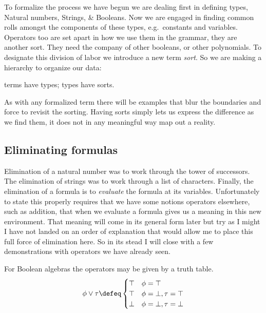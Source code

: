 To formalize the process we have begun we are dealing first in defining types, 
Natural numbers, Strings, \& Booleans.  Now we are engaged in finding common rolls 
amongst the components of these types, e.g.\ constants and variables.
Operators too are set apart in how we use them in the grammar, they are another sort.  They 
need the company of other booleans, or other polynomials.
To designate this division of labor we introduce a new term \emph{sort}.
So we are making a hierarchy to organize our data:
\begin{center}
    terms have types;
    types have sorts.
\end{center}
As with any formalized term there will be examples that blur the boundaries and force 
to revisit the sorting.  Having sorts simply lets us express the difference as we 
find them, it does not in any meaningful way map out a reality.

\subsection{Eliminating formulas}

Elimination of a natural number was to work through the tower of successors.
The elimination of strings was to work through a list of characters. 
Finally, the elimination of a formula is to \emph{evaluate} the formula 
at its variables.  Unfortunately to state this properly requires that we have 
some notions operators elsewhere, such as addition, that when we evaluate a formula 
gives us a meaning in this new environment.  That meaning will come in its general 
form later but try as I might I have not landed on an order of explanation that would 
allow me to place this full force of elimination here.  So in its stead I will close with a 
few demonstrations with operators we have already seen.

For Boolean algebras the operators may be given by a truth table.
\begin{align*}
    \phi \vee \tau \defeq \begin{cases}
        \top & \phi=\top\\
        \top & \phi=\bot, \tau=\top\\
        \bot & \phi=\bot, \tau=\bot
    \end{cases}
\end{align*}
